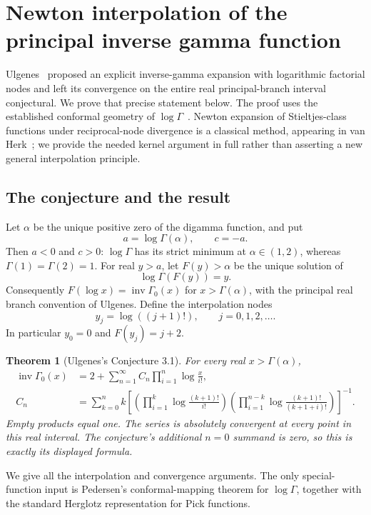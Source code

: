 \documentclass[11pt,a4paper]{article}
\newtheorem{theorem}{Theorem}[section]
\theoremstyle{definition}
\theoremstyle{remark}
\numberwithin{equation}{section}
\begin{document}
\section{Newton interpolation of the principal inverse gamma function}
\label{inv:inv:overview}
Ulgenes~\cite[Conjecture~3.1]{Ulgenes} proposed an explicit inverse-gamma
expansion with logarithmic factorial nodes and left its convergence
on the entire real principal-branch interval conjectural. We prove
that precise statement below. The proof uses the established
conformal geometry of $\log\Gamma$~\cite{Pedersen}. Newton expansion
of Stieltjes-class functions under reciprocal-node divergence is a
classical method, appearing in van Herk~\cite[Theorem~48]{vanHerk};
we provide the needed kernel argument in full rather than asserting
a new general interpolation principle.

\subsection{The conjecture and the result}

Let $\alpha$ be the unique positive zero of the digamma function, and put
\[
 a=\log\Gamma(\alpha),\qquad c=-a.
\]
Then $a<0$ and $c>0$: $\log\Gamma$ has its strict minimum at
$\alpha\in(1,2)$, whereas $\Gamma(1)=\Gamma(2)=1$.
For real $y>a$, let $F(y)>\alpha$ be the unique solution of
\[
 \log\Gamma(F(y))=y.
\]
Consequently $F(\log x)=\operatorname{inv}\Gamma_0(x)$ for
$x>\Gamma(\alpha)$, with the principal real branch convention of Ulgenes.
Define the interpolation nodes
\[
 y_j=\log((j+1)!),\qquad j=0,1,2,\ldots.
\]
In particular $y_0=0$ and $F(y_j)=j+2$.

\begin{theorem}[Ulgenes's Conjecture 3.1]
For every real $x>\Gamma(\alpha)$,
\begin{align*}
 \operatorname{inv}\Gamma_0(x)
 &=2+\sum_{n=1}^{\infty} C_n
       \prod_{i=1}^{n}\log\frac{x}{i!},\\
 C_n
 &=\sum_{k=0}^{n} k
 \left[
  \left(\prod_{i=1}^{k}\log\frac{(k+1)!}{i!}\right)
  \left(\prod_{i=1}^{n-k}
                  \log\frac{(k+1)!}{(k+1+i)!}\right)
 \right]^{-1}.
\end{align*}
Empty products equal one. The series is absolutely convergent at every
point in this real interval. The conjecture's additional $n=0$ summand
is zero, so this is exactly its displayed formula.
\end{theorem}

We give all the interpolation and convergence arguments. The only
special-function input is Pedersen's conformal-mapping theorem for
$\log\Gamma$, together with the standard Herglotz representation for
Pick functions.
\end{document}
